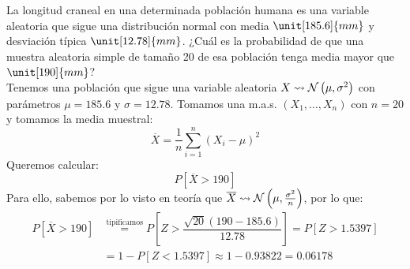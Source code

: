 \begin{ejercicio}
    La longitud craneal en una determinada población humana es una variable aleatoria que sigue una distribución normal con media $\unit[185.6]{mm}$ y desviación típica $\unit[12.78]{mm}$. ¿Cuál es la probabilidad de que una muestra aleatoria simple de tamaño 20 de esa población tenga media mayor que $\unit[190]{mm}$?\\

    \noindent
    Tenemos una población que sigue una variable aleatoria $X\rightsquigarrow \mathcal{N}\left(\mu, \sigma^2\right)$ con parámetros $\mu = 185.6$ y $\sigma=12.78$. Tomamos una m.a.s. $(X_1, \ldots, X_n)$ con $n=20$ y tomamos la media muestral:
    \begin{equation*}
        \overline{X} = \dfrac{1}{n}\sum_{i=1}^{n}{(X_i - \mu)}^{2}
    \end{equation*}
    Queremos calcular:
    \begin{equation*}
        P\left[\overline{X}>190\right]
    \end{equation*}
    Para ello, sabemos por lo visto en teoría que $\overline{X}\rightsquigarrow\mathcal{N}\left(\mu, \frac{\sigma^2}{n}\right)$, por lo que:
    \begin{align*}
        P\left[\overline{X}>190\right] &\stackrel{\text{tipificamos}}{=} P\left[Z > \dfrac{\sqrt{20}(190-185.6)}{12.78}\right] = P[Z > 1.5397] \\ 
                                                                     &= 1-P[Z<1.5397] \approx 1-0.93822 = 0.06178
    \end{align*}
\end{ejercicio}

